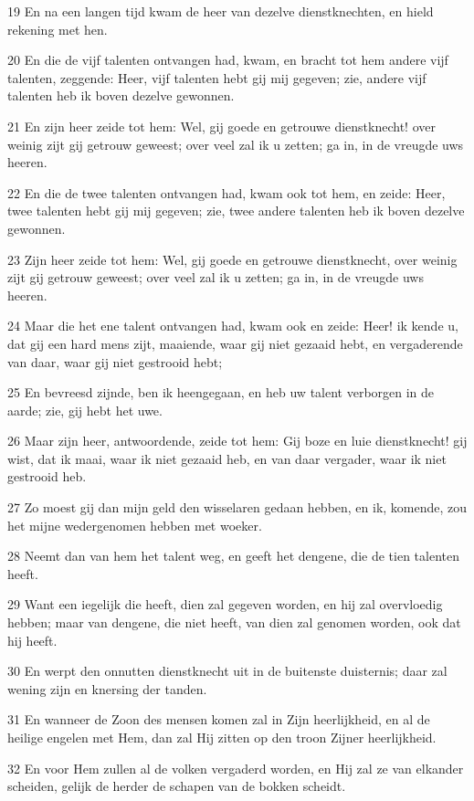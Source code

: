 \par 19 En na een langen tijd kwam de heer van dezelve dienstknechten, en hield rekening met hen.
\par 20 En die de vijf talenten ontvangen had, kwam, en bracht tot hem andere vijf talenten, zeggende: Heer, vijf talenten hebt gij mij gegeven; zie, andere vijf talenten heb ik boven dezelve gewonnen.
\par 21 En zijn heer zeide tot hem: Wel, gij goede en getrouwe dienstknecht! over weinig zijt gij getrouw geweest; over veel zal ik u zetten; ga in, in de vreugde uws heeren.
\par 22 En die de twee talenten ontvangen had, kwam ook tot hem, en zeide: Heer, twee talenten hebt gij mij gegeven; zie, twee andere talenten heb ik boven dezelve gewonnen.
\par 23 Zijn heer zeide tot hem: Wel, gij goede en getrouwe dienstknecht, over weinig zijt gij getrouw geweest; over veel zal ik u zetten; ga in, in de vreugde uws heeren.
\par 24 Maar die het ene talent ontvangen had, kwam ook en zeide: Heer! ik kende u, dat gij een hard mens zijt, maaiende, waar gij niet gezaaid hebt, en vergaderende van daar, waar gij niet gestrooid hebt;
\par 25 En bevreesd zijnde, ben ik heengegaan, en heb uw talent verborgen in de aarde; zie, gij hebt het uwe.
\par 26 Maar zijn heer, antwoordende, zeide tot hem: Gij boze en luie dienstknecht! gij wist, dat ik maai, waar ik niet gezaaid heb, en van daar vergader, waar ik niet gestrooid heb.
\par 27 Zo moest gij dan mijn geld den wisselaren gedaan hebben, en ik, komende, zou het mijne wedergenomen hebben met woeker.
\par 28 Neemt dan van hem het talent weg, en geeft het dengene, die de tien talenten heeft.
\par 29 Want een iegelijk die heeft, dien zal gegeven worden, en hij zal overvloedig hebben; maar van dengene, die niet heeft, van dien zal genomen worden, ook dat hij heeft.
\par 30 En werpt den onnutten dienstknecht uit in de buitenste duisternis; daar zal wening zijn en knersing der tanden.
\par 31 En wanneer de Zoon des mensen komen zal in Zijn heerlijkheid, en al de heilige engelen met Hem, dan zal Hij zitten op den troon Zijner heerlijkheid.
\par 32 En voor Hem zullen al de volken vergaderd worden, en Hij zal ze van elkander scheiden, gelijk de herder de schapen van de bokken scheidt.
